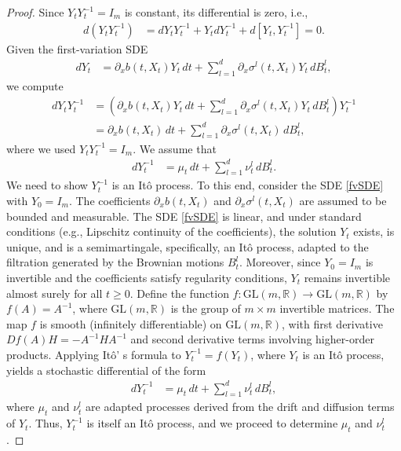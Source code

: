 \documentclass[]{interact}
\newcommand{\1}{\mathbf{1}}
\theoremstyle{plain}%
\theoremstyle{definition}
\theoremstyle{remark}
\numberwithin{equation}{section}
\begin{document}
\begin{proof}
Since \( Y_t Y_t^{-1} = I_m \) is constant, its differential is zero, i.e.,
\begin{align*}
d(Y_t Y_t^{-1}) &= dY_t Y_t^{-1} + Y_t dY_t^{-1} + d[Y_t, Y_t^{-1}] = 0.
\end{align*}
Given the first-variation SDE
\begin{align}
dY_t &= \partial_x b(t, X_t) Y_t \, dt + \sum_{l=1}^d \partial_x \sigma^l(t, X_t) Y_t \, dB_t^l,
\label{fvSDE}
\end{align}
we compute
\begin{align*}
dY_t Y_t^{-1} &= \left( \partial_x b(t, X_t) Y_t \, dt + \sum_{l=1}^d \partial_x \sigma^l(t, X_t) Y_t \, dB_t^l \right) Y_t^{-1} \\
&= \partial_x b(t, X_t) \, dt + \sum_{l=1}^d \partial_x \sigma^l(t, X_t) \, dB_t^l,
\end{align*}
where we used \( Y_t Y_t^{-1} = I_m \). We assume that
\begin{align*}
dY_t^{-1} &= \mu_t \, dt + \sum_{l=1}^d \nu_t^l \, dB_t^l.
\end{align*}
We need to show \( Y_t^{-1} \) is an It\^o process. To this end, consider the SDE \eqref{fvSDE}
with \( Y_0 = I_m \). The coefficients \( \partial_x b(t, X_t) \) and \( \partial_x \sigma^l(t, X_t) \) are assumed to be bounded and measurable. The SDE  \eqref{fvSDE} is linear, and under standard conditions (e.g., Lipschitz continuity of the coefficients), the solution \( Y_t \) exists, is unique, and is a semimartingale, specifically, an It\^o process, adapted to the filtration generated by the Brownian motions \( B_t^l \). Moreover, since \( Y_0 = I_m \) is invertible and the coefficients satisfy regularity conditions, \( Y_t \) remains invertible almost surely for all \( t \geq 0 \). Define the function \( f: \text{GL}(m, \mathbb{R}) \to \text{GL}(m, \mathbb{R}) \) by \( f(A) = A^{-1} \), where \( \text{GL}(m, \mathbb{R}) \) is the group of \( m \times m \) invertible matrices. The map \( f \) is smooth (infinitely differentiable) on \( \text{GL}(m, \mathbb{R}) \), with first derivative \( Df(A)H = -A^{-1} H A^{-1} \) and second derivative terms involving higher-order products. Applying It\^o' s formula to \( Y_t^{-1} = f(Y_t) \), where \( Y_t \) is an It\^o process, yields a stochastic differential of the form
\begin{align*}
dY_t^{-1} &= \mu_t \, dt + \sum_{l=1}^d \nu_t^l \, dB_t^l,
\end{align*}
where \( \mu_t \) and \( \nu_t^l \) are adapted processes derived from the drift and diffusion terms of \( Y_t \). Thus, \( Y_t^{-1} \) is itself an Itô process, and we proceed to determine \( \mu_t \) and \( \nu_t^l \).

\end{proof}
\end{document}
